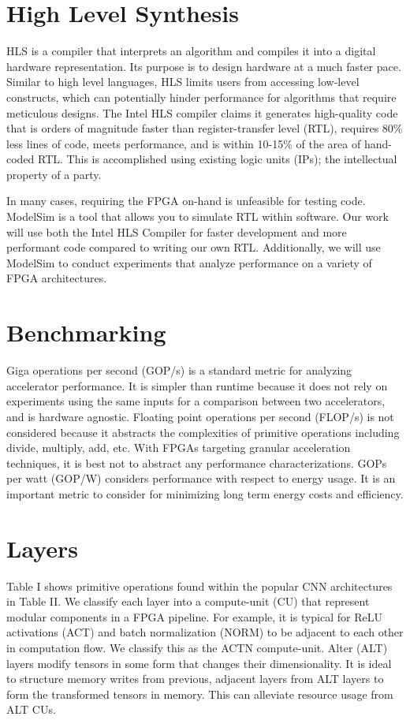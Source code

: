 \section{High Level Synthesis}
HLS is a compiler that interprets an algorithm and compiles it into a digital hardware representation. Its purpose is to design hardware at a much faster pace. Similar to high level languages, HLS limits users from accessing low-level constructs, which can potentially hinder performance for algorithms that require meticulous designs. The Intel HLS compiler claims it generates high-quality code that is orders of magnitude faster than register-transfer level (RTL), requires 80\% less lines of code, meets performance, and is within 10-15\% of the area of hand- coded RTL. This is accomplished using existing logic units (IPs); the intellectual property of a party.

In many cases, requiring the FPGA on-hand is unfeasible for testing code. ModelSim is a tool that allows you to simulate RTL within software. Our work will use both the Intel HLS Compiler for faster development and more performant code compared to writing our own RTL. Additionally, we will use ModelSim to conduct experiments that analyze performance on a variety of FPGA architectures.

\section{Benchmarking}
Giga operations per second (GOP/s) is a standard metric for analyzing accelerator performance. It is simpler than runtime because it does not rely on experiments using the same inputs for a comparison between two accelerators, and is hardware agnostic. Floating point operations per second (FLOP/s) is not considered because it abstracts the complexities of primitive operations including divide, multiply, add, etc. With FPGAs targeting granular acceleration techniques, it is best not to abstract any performance characterizations. GOPs per watt (GOP/W) considers performance with respect to energy usage. It is an important metric to consider for minimizing long term energy costs and efficiency.

\section{Layers}
Table I shows primitive operations found within the popular CNN architectures in Table II. We classify each layer into a compute-unit (CU) that represent modular components in a FPGA pipeline. For example, it is typical for ReLU activations (ACT) and batch normalization (NORM) to be adjacent to each other in computation flow. We classify this as the ACTN compute-unit. Alter (ALT) layers modify tensors in some form that changes their dimensionality. It is ideal to structure memory writes from previous, adjacent layers from ALT layers to form the transformed tensors in memory. This can alleviate resource usage from ALT CUs.

